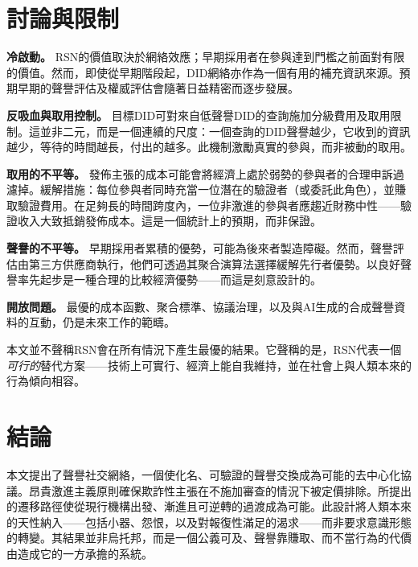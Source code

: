 \documentclass[11pt,a4paper,twocolumn]{article}
\begin{document}
\section{討論與限制}

\textbf{冷啟動。} RSN的價值取決於網絡效應；早期採用者在參與達到門檻之前面對有限的價值。然而，即使從早期階段起，DID網絡亦作為一個有用的補充資訊來源。預期早期的聲譽評估及權威評估會隨著日益精密而逐步發展。

\textbf{反吸血與取用控制。} 目標DID可對來自低聲譽DID的查詢施加分級費用及取用限制。這並非二元，而是一個連續的尺度：一個查詢的DID聲譽越少，它收到的資訊越少，等待的時間越長，付出的越多。此機制激勵真實的參與，而非被動的取用。

\textbf{取用的不平等。} 發佈主張的成本可能會將經濟上處於弱勢的參與者的合理申訴過濾掉。緩解措施：每位參與者同時充當一位潛在的驗證者（或委託此角色），並賺取驗證費用。在足夠長的時間跨度內，一位非激進的參與者應趨近財務中性——驗證收入大致抵銷發佈成本。這是一個統計上的預期，而非保證。

\textbf{聲譽的不平等。} 早期採用者累積的優勢，可能為後來者製造障礙。然而，聲譽評估由第三方供應商執行，他們可透過其聚合演算法選擇緩解先行者優勢。以良好聲譽率先起步是一種合理的比較經濟優勢——而這是刻意設計的。

\textbf{開放問題。} 最優的成本函數、聚合標準、協議治理，以及與AI生成的合成聲譽資料的互動，仍是未來工作的範疇。

本文並不聲稱RSN會在所有情況下產生最優的結果。它聲稱的是，RSN代表一個\emph{可行的}替代方案——技術上可實行、經濟上能自我維持，並在社會上與人類本來的行為傾向相容。

\section{結論}

本文提出了聲譽社交網絡，一個使化名、可驗證的聲譽交換成為可能的去中心化協議。昂貴激進主義原則確保欺詐性主張在不施加審查的情況下被定價排除。所提出的遷移路徑使從現行機構出發、漸進且可逆轉的過渡成為可能。此設計將人類本來的天性納入——包括小器、怨恨，以及對報復性滿足的渴求——而非要求意識形態的轉變。其結果並非烏托邦，而是一個公義可及、聲譽靠賺取、而不當行為的代價由造成它的一方承擔的系統。


\end{document}
